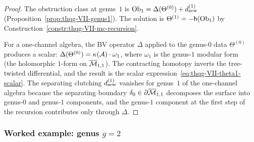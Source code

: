 \begin{proof}
The obstruction class at genus~$1$ is
$\mathrm{Ob}_1 = \Delta(\Theta^{(0)}) + d_{\mathrm{sew}}^{(1)}$
(Proposition~\ref{prop:thqg-VII-genus1}). The solution is
$\Theta^{(1)} = -\mathsf{h}(\mathrm{Ob}_1)$ by
Construction~\ref{constr:thqg-VII-mc-recursion}.

For a one-channel algebra, the BV operator $\Delta$ applied to
the genus-$0$ data $\Theta^{(0)}$ produces a scalar:
$\Delta(\Theta^{(0)}) = \kappa(\mathcal{A}) \cdot \omega_1$, where
$\omega_1$ is the genus-$1$ modular form (the holomorphic
$1$-form on $\overline{\mathcal{M}}_{1,1}$). The contracting homotopy
inverts the tree-twisted differential, and the result is the
scalar expression~\eqref{eq:thqg-VII-theta1-scalar}.
The separating clutching $d_{\mathrm{sew}}^{(1)}$ vanishes for genus~$1$
of the one-channel algebra because the separating boundary
$\delta_0 \in \partial\overline{\mathcal{M}}_{1,1}$ decomposes the
surface into genus-$0$ and genus-$1$ components, and the
genus-$1$ component at the first step of the recursion
contributes only through $\Delta$.
\end{proof}

\subsubsection{Worked example: genus $g = 2$}
\label{subsubsec:thqg-VII-genus2-worked}

